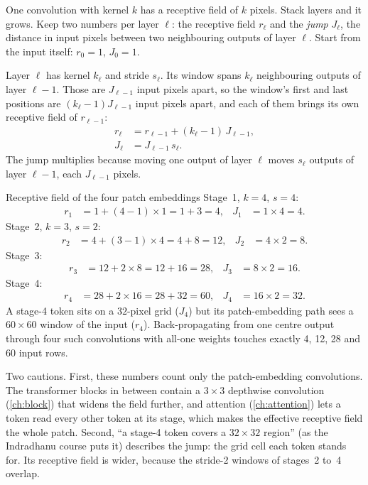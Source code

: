One convolution with kernel $k$ has a receptive field of $k$ pixels. Stack layers and it grows. Keep
two numbers per layer $\ell$: the receptive field $r_\ell$ and the \emph{jump} $J_\ell$, the
distance in input pixels between two neighbouring outputs of layer $\ell$. Start from the input itself:
$r_0 = 1$, $J_0 = 1$.

Layer $\ell$ has kernel $k_\ell$ and stride $s_\ell$. Its window spans $k_\ell$ neighbouring outputs of
layer $\ell-1$. Those are $J_{\ell-1}$ input pixels apart, so the window's first and last positions are
$(k_\ell-1)J_{\ell-1}$ input pixels apart, and each of them brings its own receptive field of
$r_{\ell-1}$:
\begin{align}
r_\ell &= r_{\ell-1} + (k_\ell - 1)\,J_{\ell-1}, \label{eq:shapes:rf}\\
J_\ell &= J_{\ell-1}\, s_\ell. \label{eq:shapes:jump}
\end{align}
The jump multiplies because moving one output of layer $\ell$ moves $s_\ell$ outputs of layer
$\ell-1$, each $J_{\ell-1}$ pixels.

\begin{worked}[label={we:shapes:rf}]{Receptive field of the four patch embeddings}
Stage~1, $k=4$, $s=4$:
\begin{align*}
r_1 &= 1 + (4-1)\times1 = 1 + 3 = 4, & J_1 &= 1\times4 = 4.
\end{align*}
Stage~2, $k=3$, $s=2$:
\begin{align*}
r_2 &= 4 + (3-1)\times4 = 4 + 8 = 12, & J_2 &= 4\times2 = 8.
\end{align*}
Stage~3:
\begin{align*}
r_3 &= 12 + 2\times8 = 12 + 16 = 28, & J_3 &= 8\times2 = 16.
\end{align*}
Stage~4:
\begin{align*}
r_4 &= 28 + 2\times16 = 28 + 32 = 60, & J_4 &= 16\times2 = 32.
\end{align*}
A stage-4 token sits on a $32$-pixel grid ($J_4$) but its patch-embedding path sees a $60\times60$
window of the input ($r_4$). Back-propagating from one centre output through four such convolutions
with all-one weights touches exactly 4, 12, 28 and 60 input rows\tagC.
\end{worked}

Two cautions. First, these numbers count only the patch-embedding convolutions. The transformer blocks
in between contain a $3\times3$ depthwise convolution (\cref{ch:block}) that widens the field further,
and attention (\cref{ch:attention}) lets a token read every other token at its stage, which makes the
effective receptive field the whole patch. Second, ``a stage-4 token covers a $32\times32$ region'' (as
the Indradhanu course puts it) describes the jump: the grid cell each token stands for. Its receptive
field is wider, because the stride-2 windows of stages~2 to~4 overlap.

